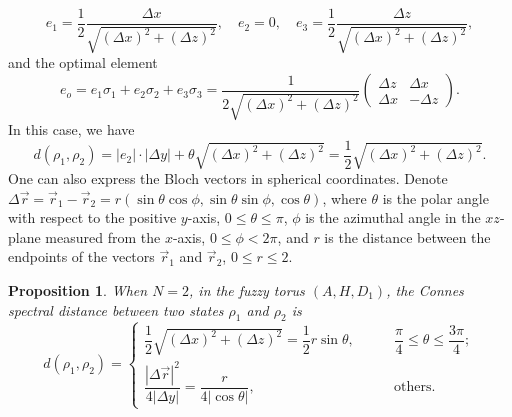 \documentclass[a4paper,11pt]{article}
\newtheorem{proposition}{Proposition}
\begin{document}
\begin{equation}
  e_1 = \frac{1}{2}  \frac{\Delta x}{\sqrt{(\Delta x)^2 + (\Delta
  z)^2}}, \quad e_2 = 0, \quad e_3 = \frac{1}{2}  \frac{\Delta
  z}{\sqrt{(\Delta x)^2 + (\Delta z)^2}},
\end{equation}
and the optimal element
\begin{equation}
  e_o = e_1 \sigma_1 + e_2 \sigma_2 + e_3 \sigma_3 = \frac{1}{2 \sqrt{(\Delta x)^2 + (\Delta z)^2}} \left( \begin{array}{cc}
    \Delta z & \Delta x\\
    \Delta x & - \Delta z
  \end{array} \right) .
\end{equation}
In this case, we have
\begin{equation}
  d (\rho_1, \rho_2) = |e_2 | \cdot | \Delta y| + \theta \sqrt{(\Delta x)^2 +
  (\Delta z)^2} = \frac{1}{2}  \sqrt{(\Delta x)^2 + (\Delta z)^2} .
\end{equation}
One can also express the Bloch vectors in spherical coordinates. Denote
$\Delta \vec{r} = \vec{r}_1 - \vec{r}_2 = r (\sin \theta \cos \phi, \sin
\theta \sin \phi, \cos \theta)$, where $\theta$ is the polar angle with
respect to the positive $y$-axis, $0 \leqslant \theta \leqslant \pi$, $\phi$
is the azimuthal angle in the $xz$-plane measured from the $x$-axis, $0
\leqslant \phi < 2 \pi$, and $r$ is the distance between the endpoints of the
vectors $\vec{r}_1$ and $\vec{r}_2$, $0 \leqslant r \leqslant 2$.

\begin{proposition}
  When $N = 2$, in the fuzzy torus $(A, H, D_1)$, the Connes spectral distance
  between two states $\rho_1$ and $\rho_2$ is
  \begin{equation}
    d (\rho_1, \rho_2) = \left\{ \begin{array}{ll}
      \dfrac{1}{2}  \sqrt{(\Delta x)^2 + (\Delta z)^2} = \dfrac{1}{2
      } r \sin \theta, & \qquad \dfrac{\pi}{4} \leqslant \theta
      \leqslant \dfrac{3 \pi}{4} ;\\[1em]
      \dfrac{| \Delta \vec{r} |^2}{4 | \Delta y|} = \dfrac{r}{4
      | \cos \theta |}, & \qquad \text{others.}
    \end{array} \right.
  \end{equation}
\end{proposition}
\end{document}
